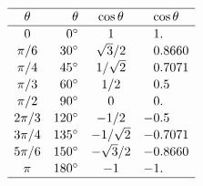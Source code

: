 \begin{table}
\caption{When a  is one of these tabulated special values, then we know the corresponding  exactly.  
In other cases, we usually use a calculator (\texttt{arccos} or \(\texttt{cos}^{-1}\)) or computer (\texttt{acos()}) to compute the }
\label{tbl:cosines}
%
\begin{equation*}\def\arraystretch{1.1}
\begin{array}{crcr@.l}
\hline
\theta&\theta&\cos\theta&\multicolumn2c{\cos\theta}
\\\hline
0&0^\circ&1&1
\\\pi/6&30^\circ&{\sqrt3}/2&0&8660
\\\pi/4&45^\circ&1/{\sqrt2}&0&7071
\\\pi/3&60^\circ&1/2&0&5
\\\pi/2&90^\circ&0&0
\\{2\pi}/3&120^\circ&-1/2&-0&5
\\{3\pi}/4&135^\circ&-1/{\sqrt2}&-0&7071
\\{5\pi}/6&150^\circ&-{\sqrt3}/2&-0&8660
\\\pi&180^\circ&-1&-1
\\\hline
\end{array}
\end{equation*}
\end{table}




